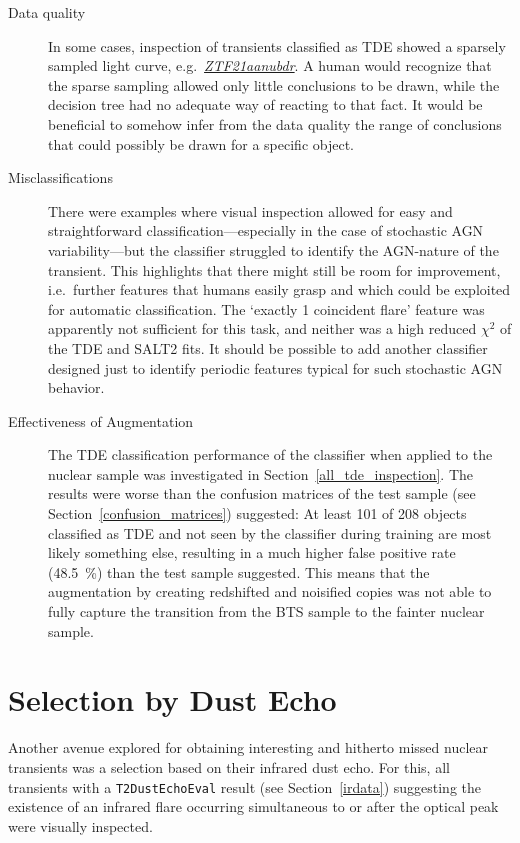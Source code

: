 \begin{description}
  \item[Data quality] In some cases, inspection of transients classified as TDE showed a sparsely sampled light curve, e.g.~\textit{\href{https://ztfnuclear.simeonreusch.com/transient/ZTF21aanubdr}{ZTF21aanubdr}}. A human would recognize that the sparse sampling allowed only little conclusions to be drawn, while the decision tree had no adequate way of reacting to that fact. It would be beneficial to somehow infer from the data quality the range of conclusions that could possibly be drawn for a specific object.
  \item[Misclassifications] There were examples where visual inspection allowed for easy and straightforward classification---especially in the case of stochastic AGN variability---but the classifier struggled to identify the AGN-nature of the transient. This highlights that there might still be room for improvement, i.e.~further features that humans easily grasp and which could be exploited for automatic classification. The `exactly 1 coincident flare' feature was apparently not sufficient for this task, and neither was a high reduced $\chi^2$ of the TDE and SALT2 fits. It should be possible to add another classifier designed just to identify periodic features typical for such stochastic AGN behavior.
  \item[Effectiveness of Augmentation] The TDE classification performance of the classifier when applied to the nuclear sample was investigated in Section~\ref{all_tde_inspection}. The results were worse than the confusion matrices of the test sample (see Section~\ref{confusion_matrices}) suggested: At least 101 of 208 objects classified as TDE and not seen by the classifier during training are most likely something else, resulting in a much higher false positive rate (\SI{48.5}{\percent}) than the test sample suggested. This means that the augmentation by creating redshifted and noisified copies was not able to fully capture the transition from the BTS sample to the fainter nuclear sample.
\end{description}

\section{Selection by Dust Echo}\label{dustecho_sel}
Another avenue explored for obtaining interesting and hitherto missed nuclear transients was a selection based on their infrared dust echo. For this, all transients with a \texttt{T2DustEchoEval} result (see Section~\ref{irdata}) suggesting the existence of an infrared flare occurring simultaneous to or after the optical peak were visually inspected.

